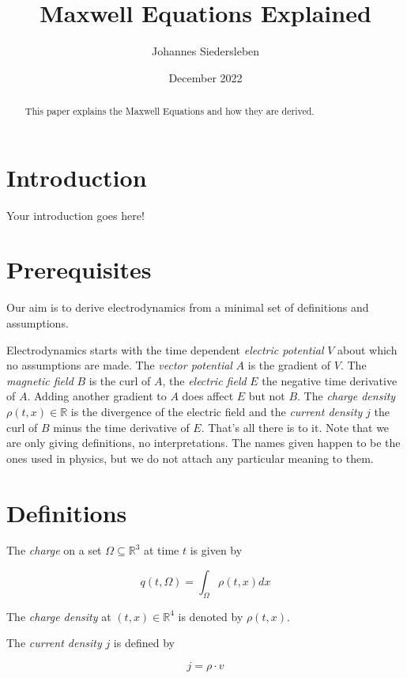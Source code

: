 \documentclass{article}
\title{Maxwell Equations Explained}
\author{Johannes Siedersleben}
\date{December 2022}
\begin{document}
\maketitle

\begin{abstract}
This paper explains the Maxwell Equations and how they are derived.
\end{abstract}

\section{Introduction}

Your introduction goes here!

\section{Prerequisites}
Our aim is to derive electrodynamics from a minimal set of definitions and assumptions.

Electrodynamics starts with the time dependent \emph{electric potential} $V$ about which no assumptions are made. The \emph{vector potential} $A$ is the gradient of $V$. The \emph{magnetic field} $B$ is the curl of $A$, the \emph{electric field} $E$ the negative time derivative of $A$.  Adding another gradient to $A$ does affect $E$ but not $B$. The \emph{charge density} $\rho(t, x) \in \mathbb{R}$ is the divergence of the electric field and the \emph{current density} $j$ the curl of $B$ minus the time derivative of $E$. That's all there is to it. Note that we are only giving definitions, no interpretations. The names given happen to be the ones used in physics, but we do not attach any particular meaning to them.


\section{Definitions}

The \emph{charge} on a set \(\Omega \subseteq \mathbb{R}^3\) at time $t$ is given by

\begin{equation}
q(t, \Omega) = \int_{\Omega} \rho(t, x) dx
\end{equation}

The \emph{charge density} at $(t, x) \in \mathbb{R}^4$ is denoted by \(\rho(t, x)\).

The \emph{current density} \(j\) is defined by

\begin{equation}
j = \rho \cdot v
\end{equation}
\end{document}

